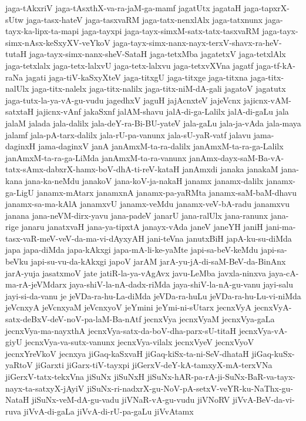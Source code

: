 {jaga-tAkxriV
jaga-tAsxthX-va-ra-jaM-ga-mamf
jagatUtx
jagataH
jaga-tapxrX-sUtw
jaga-tasx-hateV
jaga-tasxvaRM
jaga-tatx-nenxlAlx
jaga-tatxnunx
jaga-tayx-ka-lipx-ta-mapi
jaga-tayxpi
jaga-tayx-simxM-satx-tatx-tasxvaRM
jaga-tayx-simx-nAsx-keSxyXV-veYkoV
jaga-tayx-simx-nanx-nayx-terxV-shavx-ra-heV-tutaH
jaga-tayx-simx-nanx-sheV-SataH
jaga-tetxMba
jagatetxV
jaga-tetxlAlx
jaga-tetxlalx
jaga-tetx-lalxvU
jaga-tetx-lalxvu
jaga-tetxvXVna
jagatf
jaga-tf-kA-raNa
jagati
jaga-tiV-kaSxyXteV
jaga-titxgU
jaga-titxge
jaga-titxna
jaga-titx-nalUlx
jaga-titx-nalelx
jaga-titx-nalilx
jaga-titx-niM-dA-gali
jagatoV
jagatutx
jaga-tutx-la-ya-vA-gu-vudu
jagedhxV
jaguH
jajAcnxteV
jajeVcnx
jajicnx-vAM-satxtaH
jajicnx-vAnf
jakaSxnf
jalAM-shavu
jalA-di-ga-Lalilx
jalA-di-gaLu
jala
jalaM
jalada
jala-dalilx
jala-deY-ra-Bi-BU-yateV
jala-gaLu
jala-ja-vAda
jala-maya
jalamf
jala-pA-tarx-dalilx
jala-rU-pa-vanunx
jala-sU-yaR-vatf
jalavu
jama-daginxH
jama-daginxV
janA
janAmxM-ta-ra-dalilx
janAmxM-ta-ra-ga-Lalilx
janAmxM-ta-ra-ga-LiMda
janAmxM-ta-ra-vanunx
janAmx-dayx-saM-Ba-vA-tatx-sAmx-dabxrX-hamx-boV-dhA-ti-reV-kataH
janAmxdi
janaka
janakaM
jana-kana
jana-ka-neMdu
janakoV
jana-koV-ja-nakaH
janamx
janamx-dalilx
janamx-ga-LigU
janamx-mAtarx
janamxnA
janamx-pa-yaRMta
janamx-saM-baM-dhavu
janamx-sa-ma-kAlA
janamxvU
janamx-veMdu
janamx-veV-bA-radu
janamxvu
janana
jana-neVM-dirx-yavu
jana-padeV
janarU
jana-ralUlx
jana-ranunx
jana-rige
janaru
janatxvaH
jana-ya-tipxtA
janayx-vAda
janeV
janeYH
janiH
jani-ma-tasx-vaR-meV-veV-da-ma-vi-dAyxyAH
jani-teVna
janutxBiH
japA-ku-su-diMda
japa
japa-diMda
japa-kAkxgi
japa-mA-li-ke-yaMte
japi-sa-beV-keMdu
japi-sa-beVku
japi-su-vu-da-kAkxgi
japoV
jarAM
jarA-yu-jA-di-saM-BeV-da-BinAnx
jarA-yuja
jasatxmoV
jate
jatiR-la-ya-vAgAvx
javu-LeMba
javxla-ninxva
jaya-cA-ma-rA-jeVMdarx
jaya-shiV-la-nA-dadx-riMda
jaya-shiV-la-nA-gu-vanu
jayi-salu
jayi-si-da-vanu
je
jeVDa-ra-hu-La-diMda
jeVDa-ra-huLu
jeVDa-ra-hu-Lu-vi-niMda
jeVcnxyA
jeVcnxyaM
jeVcnxyoV
jeYmini
jeYmi-ni-sUtarx
jecnxVyA
jecnxVyA-satx-deBxV-deV-noV-pa-laM-Ba-nAtf
jecnxVya
jecnxVyaM
jecnxVya-gaLa
jecnxVya-ma-nayxthA
jecnxVya-satx-da-boV-dha-parx-sU-titaH
jecnxVya-vA-giyU
jecnxVya-va-sutx-vanunx
jecnxVya-vilalx
jecnxVyeV
jecnxVyoV
jecnxYreVkoV
jecnxya
jiGaq-kaSxvaH
jiGaq-kiSx-ta-ni-SeV-dhataH
jiGaq-kuSx-yaRtoV
jiGarxti
jiGarx-tiV-tayxpi
jiGerxV-deY-kA-tamxyX-mA-terxVNa
jiGerxV-tatx-tekxVna
jiSuNx
jiSuNxH
jiSuNx-hAR-pa-rA-ji-SuNx-BaR-va-tayx-nayx-ta-satxyX-jAyiV
jiSuNx-ri-nadxrX-gu-NoV-pA-setxV-veYR-ku-NaThx-gu-NataH
jiSuNx-veM-dA-gu-vadu
jiVNaR-vA-gu-vudu
jiVNoRV
jiVvA-BeV-da-vi-ruva
jiVvA-di-gaLa
jiVvA-di-rU-pa-gaLu
jiVvAtamx
}
